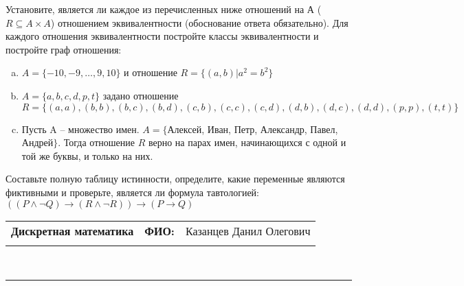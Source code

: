 \documentclass[10pt]{exam}
\newcommand{\class}{Дискретная математика}
\newcommand{\examdate}{}
\begin{document}
\begin{questions}
\question
Установите, является ли каждое из перечисленных ниже отношений на А ($R \subseteq A \times A$) отношением эквивалентности (обоснование ответа обязательно). Для каждого отношения эквивалентности постройте классы 
эквивалентности и постройте граф отношения:
\begin{enumerate} [a)]\setcounter{enumi}{0}
\item $A = \{-10, -9, … , 9, 10\}$ и отношение $R = \{(a,b)|a^{2} = b^{2}\}$
\item $A = \{a, b, c, d, p, t\}$ задано отношение $R = \{(a, a), (b, b), (b, c), (b, d), (c, b), (c, c), (c, d), (d, b), (d, c), (d, d), (p,p), (t,t)\}$
\item Пусть A – множество имен. $A = \{ $Алексей, Иван, Петр, Александр, Павел, Андрей$ \}$. Тогда отношение $R$ верно на парах имен, начинающихся с одной и той же буквы, и только на них.
\end{enumerate}\question Составьте полную таблицу истинности, определите, какие переменные являются фиктивными и проверьте, является ли формула тавтологией:
$(( P \land \neg Q) \rightarrow (R \land \neg R)) \rightarrow (P \rightarrow Q)$

\end{questions}
\newpage
\begin{flushright}
\begin{tabular}{p{2.8in} r l}
\textbf{\class} & \textbf{ФИО:} &Казанцев Данил Олегович
\\

\textbf{\examdate} &&\\
\end{tabular}\\
\end{flushright}
\rule[1ex]{\textwidth}{.1pt}
\end{document}
